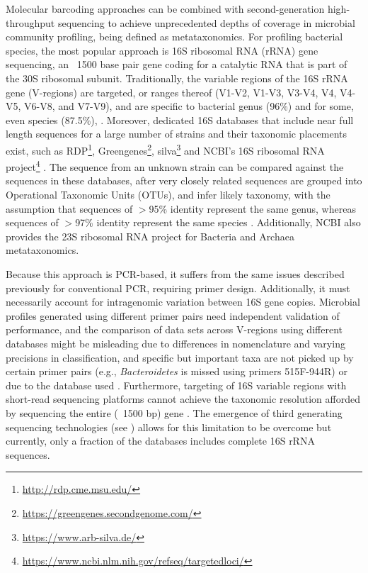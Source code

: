 Molecular barcoding approaches can be combined with second-generation high-throughput sequencing to achieve unprecedented depths of coverage in microbial community profiling, being defined as metataxonomics. 
For profiling bacterial species, the most popular approach is 16S ribosomal RNA (rRNA) gene sequencing, an ~1500 base pair gene coding for a catalytic RNA that is part of the 30S ribosomal subunit. 
Traditionally, the variable regions of the 16S rRNA gene (V-regions) are targeted, or ranges thereof (V1-V2, V1-V3, V3-V4, V4, V4-V5, V6-V8, and V7-V9), and are specific to bacterial genus (96\%) and for some, even species (87.5\%), \citep{srinivasan_use_2015, abellan-schneyder_primer_2021}. 
Moreover, dedicated 16S databases that include near full length sequences for a large number of strains and their taxonomic placements exist, such as RDP\footnote{\url{http://rdp.cme.msu.edu/}}, Greengenes\footnote{\url{https://greengenes.secondgenome.com/}}, silva\footnote{\url{https://www.arb-silva.de/}} and NCBI's 16S ribosomal RNA project\footnote{\url{https://www.ncbi.nlm.nih.gov/refseq/targetedloci/}} \citep{cole_ribosomal_2009, desantis_greengenes_2006, pruesse_silva_2007}. 
The sequence from an unknown strain can be compared against the sequences in these databases, after very closely related sequences are grouped into Operational Taxonomic Units (OTUs), and infer likely taxonomy, with the assumption that sequences of $>$95\% identity represent the same genus, whereas sequences of $>$97\% identity represent the same species \citep{schloss_introducing_2005}. 
Additionally, NCBI also provides the 23S ribosomal RNA project for Bacteria and Archaea metataxonomics. 

Because this approach is PCR-based, it suffers from the same issues described previously for conventional PCR, requiring primer design. 
Additionally, it must necessarily account for intragenomic variation between 16S gene copies. 
Microbial profiles generated using different primer pairs need independent validation of performance, and the comparison of data sets across V-regions using different databases might be misleading due to differences in nomenclature and varying precisions in classification, and specific but important taxa are not picked up by certain primer pairs (e.g., \textit{Bacteroidetes} is missed using primers 515F-944R) or due to the database used \citep{abellan-schneyder_primer_2021}. 
Furthermore, targeting of 16S variable regions with short-read sequencing platforms cannot achieve the taxonomic resolution afforded by sequencing the entire (~1500 bp) gene \citep{johnson_evaluation_2019}. 
The emergence of third generating sequencing technologies (see ) allows for this limitation to be overcome but currently, only a fraction of the databases includes complete 16S rRNA sequences.

